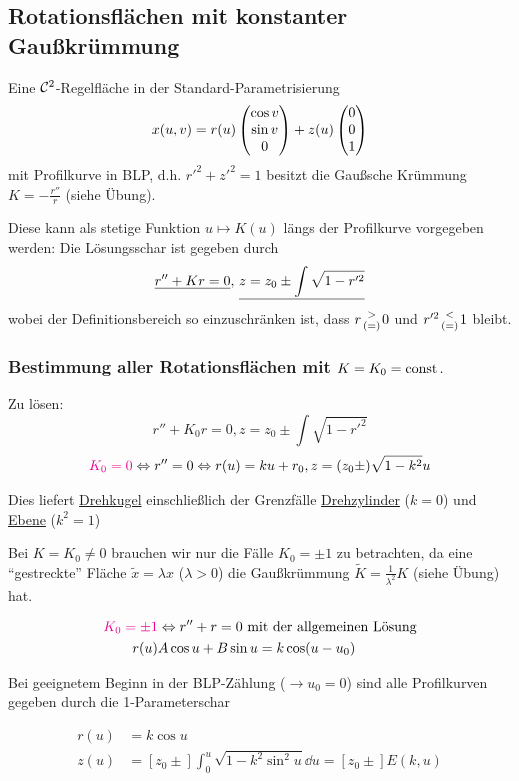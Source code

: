 \subsection{Rotationsflächen mit konstanter Gaußkrümmung}

Eine \(\mathcal{C}^2\)-Regelfläche in der Standard-Parametrisierung
\[
 x(u,v) = r(u) \begin{pmatrix} \cos v \\ \sin v \\ 0 \end{pmatrix}  + z(u) \begin{pmatrix} 0 \\ 0 \\ 1 \end{pmatrix} 
\]
mit Profilkurve in BLP, d.h. \uline{\(r'^2 + z'^2 = 1\)} besitzt die Gaußsche Krümmung \(K = -\frac{r''}{r}\) (siehe Übung). \par

Diese kann als stetige Funktion \(u \mapsto K(u)\) längs der Profilkurve vorgegeben werden: Die Lösungsschar ist gegeben durch
\[
 \uline{r'' + K r = 0}, \, \uline{z = z_0 \pm \int \sqrt{1 - r'^2}}
\]
wobei der Definitionsbereich so einzuschränken ist, dass \(r {>\atop(=)} 0\) und \(r'^2 {< \atop(=)}1\) bleibt.

\subsubsection{Bestimmung aller Rotationsflächen mit \(K = K_0 = \operatorname{const}.\)}

Zu lösen:
\[
 r'' + K_0 r = 0, z = z_0 \pm \int \sqrt{1 - r'^2}
\]
\begin{align*}
{\color{magenta}K_0 = 0}\Leftrightarrow r'' = 0 \Leftrightarrow r(u) = k u + r_0, z = (z_0 \pm) \sqrt{1-k^2} u
\end{align*}

Dies liefert \uline{Drehkugel} einschließlich der Grenzfälle \uline{Drehzylinder} (\(k = 0\)) und \uline{Ebene} (\(k^2 = 1\)) \par

Bei \(K = K_0 \ne 0\) brauchen wir nur die Fälle \(K_0 = \pm 1\) zu betrachten, da eine ``gestreckte'' Fläche \(\widetilde x = \lambda x\) (\(\lambda > 0\)) die Gaußkrümmung \(\widetilde K = \frac{1}{\lambda^2} K\) (siehe Übung) hat.

\begin{align*}
{\color{magenta}K_0 = \pm 1}&\Leftrightarrow r'' + r = 0 \text{ mit der allgemeinen Lösung} \\
r(u) & A \cos u + B \sin u = k \cos (u - u_0)
\end{align*}

Bei geeignetem Beginn in der BLP-Zählung (\(\to u_0 = 0\)) sind alle Profilkurven gegeben durch die 1-Parameterschar

\begin{align*}
 r(u) &= k \cos u \\
 z(u) &= [z_0 \pm] \int_0^u \sqrt{1 - k^2 \sin^2 u} \dd u = [z_0 \pm] E(k,u)
\end{align*}

